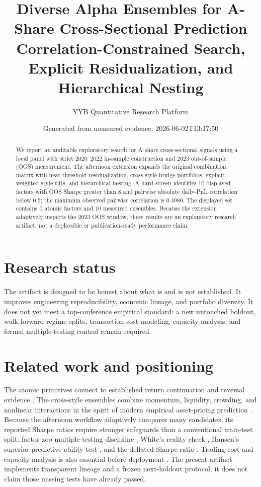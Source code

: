 \documentclass[10pt,a4paper]{article}
\title{Diverse Alpha Ensembles for A-Share Cross-Sectional Prediction\\
\large Correlation-Constrained Search, Explicit Residualization, and Hierarchical Nesting}
\author{YYB Quantitative Research Platform}
\date{Generated from measured evidence: 2026-06-02T13:17:50}
\begin{document}
\maketitle
\begin{abstract}
We report an auditable exploratory search for A-share cross-sectional signals using a local panel with strict
2020--2022 in-sample construction and 2023 out-of-sample (OOS) measurement. The afternoon extension expands
the original combination matrix with near-threshold residualization, cross-style bridge portfolios, explicit
weighted style tilts, and hierarchical nesting. A hard screen identifies 10 displayed factors with OOS
Sharpe greater than 8 and pairwise absolute daily-PnL correlation below 0.5; the maximum observed pairwise
correlation is 0.4980. The displayed set contains 0 atomic factors and
10 measured ensembles. Because the extension adaptively inspects the 2023 OOS window,
these results are an exploratory research artifact, not a deployable or publication-ready performance claim.
\end{abstract}

\section{Research status}
The artifact is designed to be honest about what is and is not established. It improves engineering
reproducibility, economic lineage, and portfolio diversity. It does not yet meet a top-conference empirical
standard: a new untouched holdout, walk-forward regime splits, transaction-cost modeling, capacity analysis,
and formal multiple-testing control remain required.

\section{Related work and positioning}
The atomic primitives connect to established return continuation and reversal evidence
\cite{debondt1985,jegadeesh1993}. The cross-style ensembles combine momentum, liquidity, crowding, and
nonlinear interactions in the spirit of modern empirical asset-pricing prediction \cite{gu2020}. Because the
afternoon workflow adaptively compares many candidates, its reported Sharpe ratios require stronger safeguards
than a conventional train-test split: factor-zoo multiple-testing discipline \cite{harvey2016}, White's
reality check \cite{white2000}, Hansen's superior-predictive-ability test \cite{hansen2005}, and the deflated
Sharpe ratio \cite{bailey2014}. Trading-cost and capacity analysis is also essential before deployment
\cite{frazzini2018}. The present artifact implements transparent lineage and a frozen next-holdout protocol;
it does not claim those missing tests have already passed.
\end{document}
